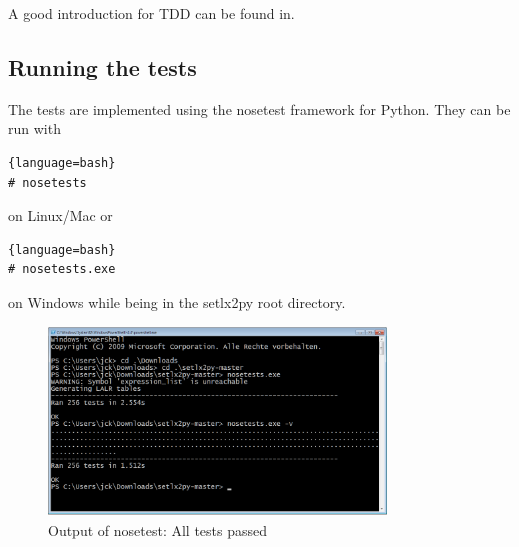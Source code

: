 
A good introduction for TDD can be found in.

\clearpage
\subsection{Running the tests}

The tests are implemented using the nosetest framework for Python. They can be run with

\begin{lstlisting}{language=bash}
# nosetests 
\end{lstlisting}

on Linux/Mac or 

\begin{lstlisting}{language=bash}
# nosetests.exe
\end{lstlisting}

on Windows while being in the setlx2py root directory.

\begin{figure}[htb]
	\centering
	\includegraphics[width=0.8\textwidth]{img/run-nose.png}
	\caption{Output of nosetest: All tests passed}
\end{figure}